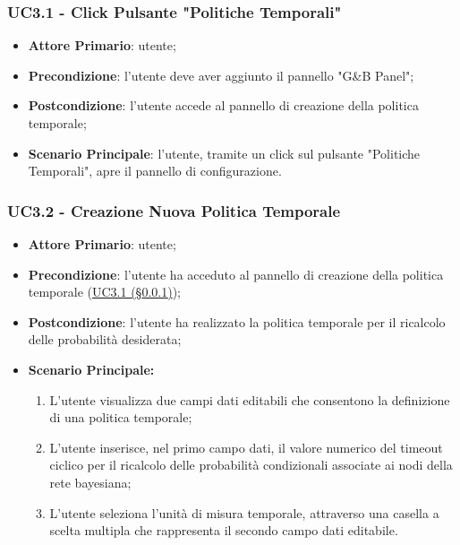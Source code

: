 \subsubsection{UC3.1 - Click Pulsante "Politiche Temporali"}\label{UC3.1}
\begin{itemize}
	\item \textbf{Attore Primario}: utente; 
	\item \textbf{Precondizione}: l'utente deve aver aggiunto il pannello "G\&B Panel";
	\item \textbf{Postcondizione}: l'utente accede al pannello di creazione della politica temporale;
	\item \textbf{Scenario Principale}: l'utente, tramite un click sul pulsante "Politiche Temporali", apre il pannello di configurazione. 
\end{itemize}

\subsubsection{UC3.2 - Creazione Nuova Politica Temporale}\label{UC3.2}

\begin{itemize}
	\item \textbf{Attore Primario}: utente; 
	\item \textbf{Precondizione}: l'utente ha acceduto al pannello di creazione della politica temporale (\hyperref[UC3.1]{UC3.1 (§\ref*{UC3.1})});
	\item \textbf{Postcondizione}: l'utente ha realizzato la politica temporale per il ricalcolo delle probabilità desiderata;
	\item \textbf{Scenario Principale:}
	\begin{enumerate}
		\item L'utente visualizza due campi dati editabili che consentono la definizione di una politica temporale;
		\item L'utente inserisce, nel primo campo dati, il valore numerico del timeout ciclico per il ricalcolo delle probabilità condizionali associate ai nodi della rete bayesiana; 
		\item L'utente seleziona l'unità di misura temporale, attraverso una casella a scelta multipla che rappresenta il secondo campo dati editabile.
	\end{enumerate}
	
\end{itemize}


